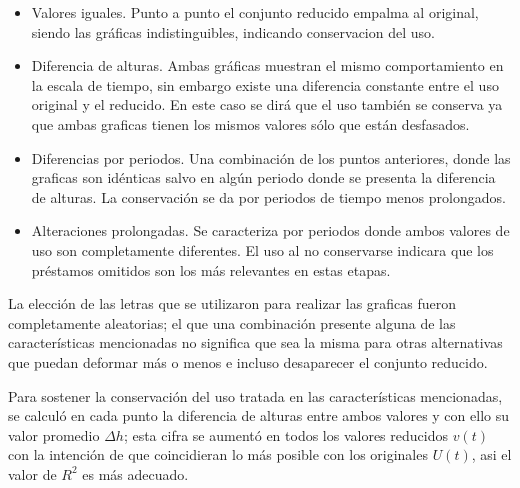 \begin{itemize}
	
	\item Valores iguales. Punto a punto el conjunto reducido empalma al original, siendo las gráficas indistinguibles, indicando conservacion del uso. 
		
	\item Diferencia de alturas. Ambas gráficas muestran el mismo comportamiento en la escala de tiempo, sin embargo existe  una diferencia constante entre el uso original y el reducido. En este caso se dirá que el uso también se conserva ya que ambas graficas tienen los mismos valores sólo que están desfasados. 
	
	\item Diferencias por periodos. Una combinación de los puntos anteriores,  donde las graficas son idénticas salvo en algún periodo donde se presenta la diferencia de alturas. La conservación se da por periodos de tiempo menos prolongados. 
	
	\item Alteraciones prolongadas. Se caracteriza por periodos donde ambos valores de uso son completamente diferentes.  El uso al no conservarse indicara que los préstamos omitidos son los más relevantes en estas etapas. 
			
\end{itemize}


La elección de las letras que se utilizaron para realizar las graficas fueron completamente aleatorias; el que una combinación presente alguna de las características mencionadas no significa que sea la misma para otras alternativas que puedan deformar más o menos e incluso desaparecer el conjunto reducido.  

Para sostener la conservación del uso tratada en las características mencionadas,  se calculó en cada punto la diferencia de alturas entre ambos valores y con ello su valor promedio $\Delta h$; esta cifra se aumentó en todos los valores reducidos $v(t)$ con la intención de que coincidieran lo más posible con los originales $U(t)$, asi el valor de $R^{2}$ es más adecuado.




